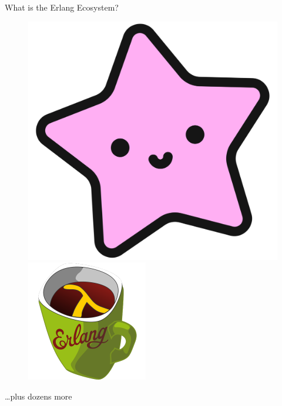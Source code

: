 \documentclass[
  ignorenonframetext,
  aspectratio=169]{beamer}
\begin{document}
\begin{frame}{What is the Erlang Ecosystem?}
\begin{figure}
\begin{minipage}{.24\textwidth}
\end{minipage}
\begin{minipage}{.24\textwidth}
  \centering
  \includegraphics[width=.8\linewidth]{./img/lucy.png}
\end{minipage}
\begin{minipage}{.24\textwidth}
  \centering
  \includegraphics[width=.8\linewidth]{./img/lfe.png}
\end{minipage}
\end{figure}

\ldots plus dozens more
\end{frame}
\end{document}
